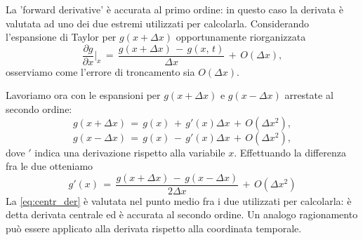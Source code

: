 La 'forward derivative' è accurata al primo ordine: in questo caso la derivata è valutata ad uno dei due estremi utilizzati per calcolarla.
Considerando l'espansione di Taylor per $g(x+\Delta x)$ opportunamente riorganizzata
\begin{equation}
\frac{\partial g}{\partial x}\bigg|_{x}\,=\,\frac{g(x+\Delta x)\,-\,g(x,\,t)}{\Delta x}\,+\,O(\Delta x),
\label{eq:forward_der}
\end{equation}
osserviamo come l'errore di troncamento sia $O(\Delta x)$.

Lavoriamo ora con le espansioni per $g(x+\Delta x)$ e $g(x-\Delta x)$ arrestate al secondo ordine:
\begin{equation}
g(x+\Delta x)\,=\,g(x)\,+\,g'(x)\Delta x\,+\,O(\Delta x ^ 2),
\label{eq:espt_1}
\end{equation}
\begin{equation}
g(x-\Delta x)\,=\,g(x)\,-\,g'(x)\Delta x\,+\,O(\Delta x ^ 2),
\label{eq:espt_2}
\end{equation}
dove $'$ indica una derivazione rispetto alla variabile $x$.
Effettuando la differenza fra le due otteniamo 
\begin{equation}
g'(x)\,=\,\frac{g(x+\Delta x)\,-\,g(x-\Delta x)}{2\Delta x}\,+\,O(\Delta x^2)
\label{eq:centr_der}
\end{equation}
La \eqref{eq:centr_der} è valutata nel punto medio fra i due utilizzati per calcolarla: è detta derivata centrale ed è accurata al secondo ordine. Un analogo ragionamento può essere applicato alla derivata rispetto alla coordinata temporale.\\

